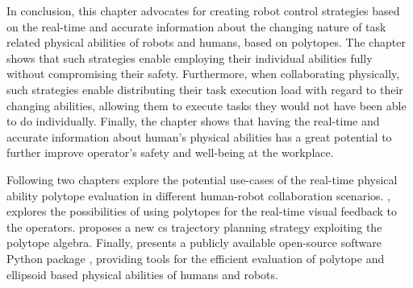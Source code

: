In conclusion, this chapter advocates for creating robot control strategies based on the real-time and accurate information about the changing nature of task related physical abilities of robots and humans, based on polytopes. The chapter shows that such strategies enable employing their individual abilities fully without compromising their safety. Furthermore, when collaborating physically, such strategies enable distributing their task execution load with regard to their changing abilities, allowing them to execute tasks they would not have been able to do individually. Finally, the chapter shows that having the real-time and accurate information about human's physical abilities has a great potential to further improve operator's safety and well-being at the workplace. 


Following two chapters explore the potential use-cases of the real-time physical ability polytope evaluation in different human-robot collaboration scenarios. , explores the possibilities of using polytopes for the real-time visual feedback to the operators.  proposes a new \gls{cs} trajectory planning strategy exploiting the polytope algebra. 
Finally,  presents a publicly available open-source software Python package , providing tools for the efficient evaluation of polytope and ellipsoid based physical abilities of humans and robots.

